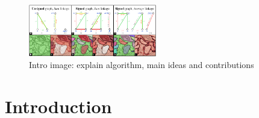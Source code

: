 
\begin{figure}
\centering
\includegraphics[width=0.50\textwidth,trim=0.4in 1.2in 0.in 0.05in,clip]{./figs/intro_image.pdf} %
\caption{\small 
Intro image: explain algorithm, main ideas and contributions 
\label{fig:intro_figure}}
\end{figure}


\section{Introduction}


